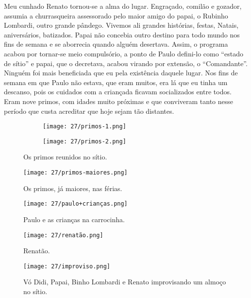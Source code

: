 Meu cunhado Renato tornou-se a alma do lugar.
Engraçado, comilão e gozador, assumia a churrasqueira assessorado pelo maior amigo do papai, o Rubinho Lombardi, outro grande pândego.
Vivemos ali grandes histórias, festas, Natais, aniversários, batizados.
Papai não concebia outro destino para todo mundo nos fins de semana e se aborrecia quando alguém desertava.
Assim, o programa acabou por tornar-se meio compulsório, a ponto de Paulo defini-lo como “estado de sítio” e papai, que o decretava, acabou virando por extensão, o “Comandante”.
Ninguém foi mais beneficiada que eu pela existência daquele lugar.
Nos fins de semana em que Paulo não estava, que eram muitos, era lá que eu tinha um descanso, pois os cuidados com a criançada ficavam socializados entre todos.
Eram nove primos, com idades muito próximas e que conviveram tanto nesse período que custa acreditar que hoje sejam tão distantes.

\begin{figure}
\hfill
\centering
\begin{subfigure}[h]{0.4\linewidth}
    \centering
\texttt{[image: 27/primos-1.png]}
\end{subfigure}
\hfill
\begin{subfigure}[h]{0.4\linewidth}
    \centering
\texttt{[image: 27/primos-2.png]}
\end{subfigure}
\caption{Os primos reunidos no sítio.}
\end{figure}

\begin{figure}
\centering
\texttt{[image: 27/primos-maiores.png]}
\caption{Os primos, já maiores, nas férias.}
\end{figure}

\begin{figure}
\centering
\texttt{[image: 27/paulo+crianças.png]}
\caption{Paulo e as crianças na carrocinha.}
\end{figure}

\begin{figure}
\centering
\texttt{[image: 27/renatão.png]}
\caption{Renatão.}
\end{figure}

\begin{figure}
\centering
\texttt{[image: 27/improviso.png]}
\caption{Vó Didi, Papai, Binho Lombardi e Renato improvisando um almoço no sítio.}
\end{figure}

